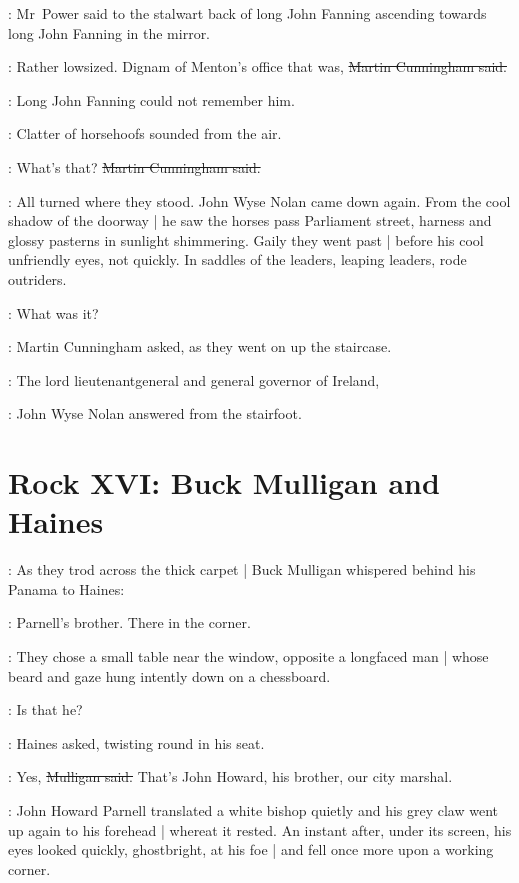 :
Mr~Power said
to the stalwart back of long John Fanning
ascending towards long John Fanning in the mirror.

\cunningham:
Rather lowsized.
Dignam of Menton's office that was,
\sout{Martin Cunningham said.}

:
Long John Fanning could not remember him.%

:
Clatter of horsehoofs sounded from the air.

\cunningham:
What's that?
\sout{Martin Cunningham said.}

:
All turned where they stood.
John Wyse Nolan came down again.
From the cool shadow of the doorway |
he saw the horses pass Parliament street,
harness and glossy pasterns in sunlight shimmering.
Gaily they went past |
before his cool unfriendly eyes,
not quickly.
In saddles of the leaders,
leaping leaders,
rode outriders.

\cunningham:
What was it?

:
Martin Cunningham asked,
as they went on up the staircase.

\johnwyse:
The lord lieutenantgeneral and general governor of Ireland,%

:
John Wyse Nolan answered from the stairfoot.


\section*{Rock XVI: Buck Mulligan and Haines}


:
As they trod across the thick carpet |
Buck Mulligan whispered behind his Panama to Haines:

\mulligan:
Parnell's brother.
There in the corner.

:
They chose a small table near the window,
opposite a longfaced man |
whose beard and gaze hung intently down on a chessboard.

\haines:
Is that he?

:
Haines asked,
twisting round in his seat.

\mulligan:
Yes,
\sout{Mulligan said.}
That's John Howard, his brother, our city marshal.

:
John Howard Parnell translated a white bishop quietly%
and his grey claw went up again to his forehead |
whereat it rested.
An instant after,
under its screen,
his eyes looked quickly, ghostbright, at his foe |
and fell once more upon a working corner.

